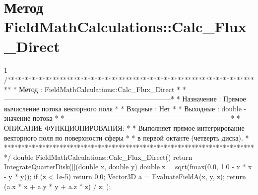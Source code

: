 \section{Метод FieldMathCalculations::Calc\_Flux\_Direct}
\footnotesize
\begin{listing}{1}
/*************************************************************************
* Метод         : FieldMathCalculations::Calc_Flux_Direct                *
*------------------------------------------------------------------------*
* Назначение    : Прямое вычисление потока векторного поля              *
* Входные       : Нет                                                    *
* Выходные      : double - значение потока                               *
*------------------------------------------------------------------------*
* ОПИСАНИЕ ФУНКЦИОНИРОВАНИЯ:                                             *
* Выполняет прямое интегрирование векторного поля по поверхности сферы   *
* в первой октанте (четверть диска).                                     *
*************************************************************************/
double FieldMathCalculations::Calc_Flux_Direct() {
    return IntegrateQuarterDisk([](double x, double y) {
        double z = sqrt(fmax(0.0, 1.0 - x * x - y * y));
        if (z < 1e-5) return 0.0;
        Vector3D a = EvaluateFieldA(x, y, z);
        return (a.x * x + a.y * y + a.z * z) / z;
    });
}
\end{listing}
\normalsize

\pagebreak
